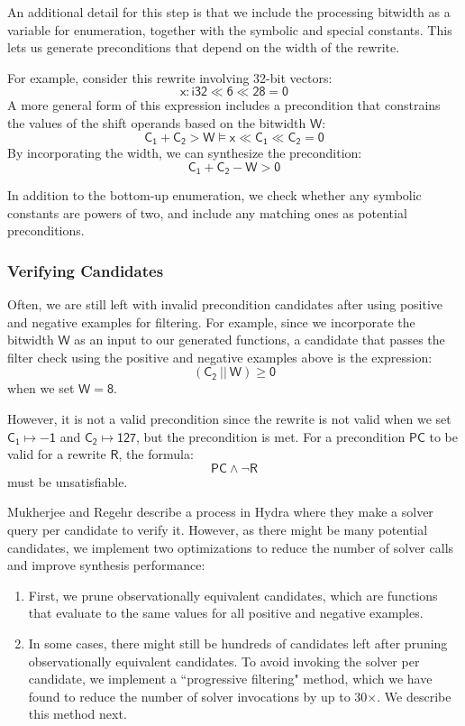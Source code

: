 \documentclass[review, anonymous, acmsmall]{acmart}
\newcommand{\blockmath}[1]{\[\mathsf{#1}\]}
\newcommand{\inline}[1]{$\mathsf{#1}$}
\begin{document}
An additional detail for this step is that we include the processing bitwidth as a variable for enumeration, together with the symbolic and special constants. This lets us generate preconditions that depend on the width of the rewrite. 

For example, consider this rewrite involving 32-bit vectors:
\blockmath{x: i32 \ll 6 \ll 28 = 0}
A more general form of this expression includes a precondition that constrains the values of the shift operands based on the bitwidth \inline{W}:
\blockmath{C_1 + C_2 > W \models x \ll C_1 \ll C_2 = 0}
By incorporating the width, we can synthesize the precondition:
\blockmath{C_1 + C_2 - W > 0}

In addition to the bottom-up enumeration, we check whether any symbolic constants are powers of two, and include any matching ones as potential preconditions. 

\subsubsection{Verifying Candidates}
Often, we are still left with invalid precondition candidates after using positive and negative examples for filtering. For example, since we incorporate the bitwidth \inline{W} as an input to our generated functions, a candidate that passes the filter check using the positive and negative examples above is the expression:
\blockmath{(C_2\ ||\  W) \geq 0} 
when we set \inline{W = 8}. 

However, it is not a valid precondition since the rewrite is not valid when we set \inline{C_1 \mapsto {-1}} and \inline{C_2 \mapsto 127}, but the precondition is met. For a precondition \inline{PC} to be valid for a rewrite \inline{R}, the formula:
        \blockmath{PC \land \neg R} 
must be unsatisfiable. 

Mukherjee and Regehr \cite{mukherjee_hydra_2024} describe a process in Hydra where they make a solver query per candidate to verify it. However, as there might be many potential candidates, we implement two optimizations to reduce the number of solver calls and improve synthesis performance:
\begin{enumerate}
    \item First, we prune observationally equivalent candidates, which are functions that evaluate to the same values for all positive and negative examples. 
    \item In some cases, there might still be hundreds of candidates left after pruning observationally equivalent candidates. To avoid invoking the solver per candidate, we implement a ``progressive filtering" method, which we have found to reduce the number of solver invocations by up to 30$\times$. We describe this method next. 
\end{enumerate}
\end{document}
